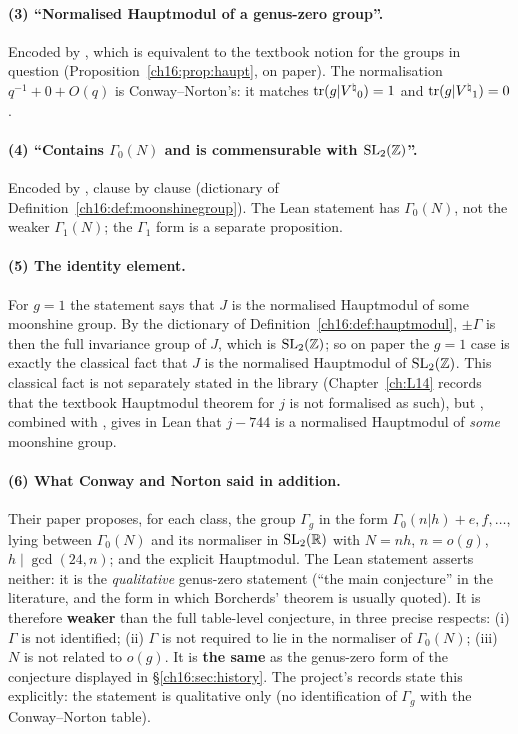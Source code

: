 \paragraph{(3) ``Normalised Hauptmodul of a genus-zero group''.}  Encoded by , which is
equivalent to the textbook notion for the groups in question (Proposition~\ref{ch16:prop:haupt}, on paper).  The
normalisation $q^{-1}+0+O(q)$ is Conway--Norton's: it matches $\operatorname{tr}(g|{V^{\natural}}_0)=1$ and $\operatorname{tr}(g|{V^{\natural}}_1)=0$.

\paragraph{(4) ``Contains $\Gamma_0(N)$ and is commensurable with $\mathrm{SL}_2(\mathbb{Z})$''.}  Encoded by
, clause by clause (dictionary of Definition~\ref{ch16:def:moonshinegroup}).  The Lean
statement has $\Gamma_0(N)$, not the weaker $\Gamma_1(N)$; the $\Gamma_1$ form is a separate proposition.

\paragraph{(5) The identity element.}  For $g=1$ the statement says that $J$ is the normalised Hauptmodul of some
moonshine group.  By the dictionary of Definition~\ref{ch16:def:hauptmodul}, $\pm\Gamma$ is then the full invariance
group of $J$, which is $\mathrm{SL}_2(\mathbb{Z})$; so on paper the $g=1$ case is exactly the classical fact that $J$ is the
normalised Hauptmodul of $\mathrm{SL}_2(\mathbb{Z})$.  This classical fact is not separately stated in the library
(Chapter~\ref{ch:L14} records that the textbook Hauptmodul theorem for $j$ is not formalised as such), but
, combined with , gives in Lean that $j-744$ is a normalised
Hauptmodul of \emph{some} moonshine group.

\paragraph{(6) What Conway and Norton said in addition.}  Their paper proposes, for each class, the group $\Gamma_g$ in
the form $\Gamma_0(n|h)+e,f,\dots$, lying between $\Gamma_0(N)$ and its normaliser in $\mathrm{SL}_2(\mathbb{R})$ with $N=nh$,
$n=o(g)$, $h\mid\gcd(24,n)$; and the explicit Hauptmodul.  The Lean statement asserts neither: it is the
\emph{qualitative} genus-zero statement (``the main conjecture'' in the literature, and the form in which Borcherds'
theorem is usually quoted).  It is therefore \textbf{weaker} than the full table-level conjecture, in three precise
respects: (i) $\Gamma$ is not identified; (ii) $\Gamma$ is not required to lie in the normaliser of $\Gamma_0(N)$;
(iii) $N$ is not related to $o(g)$.  It is \textbf{the same} as the genus-zero form of the conjecture displayed in
\S\ref{ch16:sec:history}.  The project's records state this explicitly: the statement is qualitative only (no identification of $\Gamma_g$ with the
Conway--Norton table).

